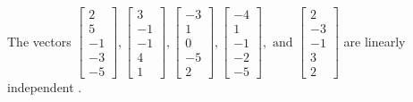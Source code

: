 \begin{exercise}
\begin{exerciseStatement}
  \end{exerciseStatement}
  \begin{exerciseAnswer}
   The vectors \(\left[\begin{array}{r}
2 \\
5 \\
-1 \\
-3 \\
-5
\end{array}\right] , \left[\begin{array}{r}
3 \\
-1 \\
-1 \\
4 \\
1
\end{array}\right] , \left[\begin{array}{r}
-3 \\
1 \\
0 \\
-5 \\
2
\end{array}\right] , \left[\begin{array}{r}
-4 \\
1 \\
-1 \\
-2 \\
-5
\end{array}\right] , \text{ and } \left[\begin{array}{r}
2 \\
-3 \\
-1 \\
3 \\
2
\end{array}\right]\) are 
  	 linearly independent  .
  


  \end{exerciseAnswer}
\end{exercise}